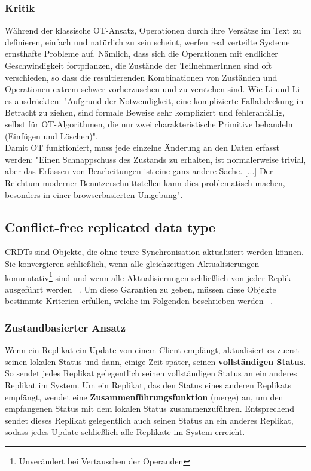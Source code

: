 \subsubsection{Kritik}
Während der klassische OT-Ansatz, Operationen durch ihre Versätze im Text zu definieren, einfach und natürlich zu sein scheint, werfen real verteilte Systeme ernsthafte Probleme auf. Nämlich, dass sich die Operationen mit endlicher Geschwindigkeit fortpflanzen, die Zustände der TeilnehmerInnen sind oft verschieden, so dass die resultierenden Kombinationen von Zuständen und Operationen extrem schwer vorherzusehen und zu verstehen sind.
Wie Li und Li es ausdrückten: "Aufgrund der Notwendigkeit, eine komplizierte Fallabdeckung in Betracht zu ziehen, sind formale Beweise sehr kompliziert und fehleranfällig, selbst für OT-Algorithmen, die nur zwei charakteristische Primitive behandeln (Einfügen und Löschen)".~\cite{ot-critic}\\
Damit OT funktioniert, muss jede einzelne Änderung an den Daten erfasst werden: "Einen Schnappschuss des Zustands zu erhalten, ist normalerweise trivial, aber das Erfassen von Bearbeitungen ist eine ganz andere Sache. [...] Der Reichtum moderner Benutzerschnittstellen kann dies problematisch machen, besonders in einer browserbasierten Umgebung".~\cite{diff_sync}
%
%
\subsection{Conflict-free replicated data type}
CRDTs sind Objekte, die ohne teure Synchronisation aktualisiert werden können. Sie konvergieren schließlich, wenn alle gleichzeitigen Aktualisierungen kommutativ\footnote{Unverändert bei Vertauschen der Operanden} sind und wenn alle Aktualisierungen schließlich von jeder Replik ausgeführt werden ~\cite{crdt_shapiro}.
Um diese Garantien zu geben, müssen diese Objekte bestimmte Kriterien erfüllen, welche im Folgenden beschrieben werden ~\cite{crdt_shapiro2}.
\subsubsection{Zustandbasierter Ansatz}
Wenn ein Replikat ein Update von einem Client empfängt, aktualisiert es zuerst seinen lokalen Status und dann, einige Zeit später, seinen \textbf{vollständigen Status}. So sendet jedes Replikat gelegentlich seinen vollständigen Status an ein anderes Replikat im System. Um ein Replikat, das den Status eines anderen Replikats empfängt, wendet eine \textbf{Zusammenführungsfunktion} (merge) an, um den empfangenen Status mit dem lokalen Status zusammenzuführen. Entsprechend sendet dieses Replikat gelegentlich auch seinen Status an ein anderes Replikat, sodass jedes Update schließlich alle Replikate im System erreicht.
